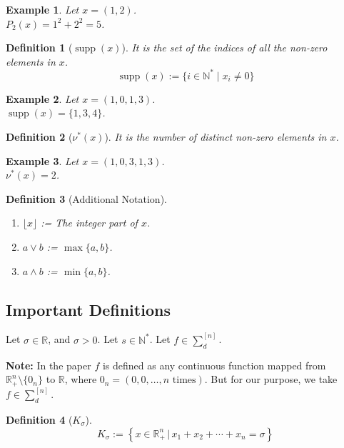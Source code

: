 \documentclass[12pt]{article}
\newtheorem{definition}{Definition}
\newtheorem{example}{Example}
\theoremstyle{definition}
\DeclareMathOperator{\supp}{supp}
\begin{document}
\begin{example}
Let $x = (1, 2)$.\\
$P_2(x) = 1^2 + 2^2 = 5$.
\end{example}

\begin{definition}[$\supp(x)$]\label{def:supp}
It is the set of the indices of all the non-zero elements in $x$.
\[
\supp(x) := \{i \in \mathbb{N}^* \mid x_i \neq 0\}
\]
\end{definition}

\begin{example}
Let $x = (1, 0, 1, 3)$.\\
$\supp(x) = \{1, 3, 4\}$.
\end{example}

\begin{definition}[$\nu^*(x)$]\label{def:nustar}
It is the number of distinct non-zero elements in $x$.
\end{definition}

\begin{example}
Let $x = (1, 0, 3, 1, 3)$.\\
$\nu^*(x) = 2$.
\end{example}

\begin{definition}[Additional Notation]\label{def:additional}
\begin{enumerate}
\item[$\alpha$)] $\lfloor x \rfloor$ := The integer part of $x$.
\item[$\beta$)] $a \vee b$ := $\max\{a, b\}$.
\item[$\gamma$)] $a \wedge b$ := $\min\{a, b\}$.
\end{enumerate}
\end{definition}

\subsection{Important Definitions}

Let $\sigma \in \mathbb{R}$, and $\sigma > 0$. Let $s \in \mathbb{N}^*$. Let $f \in \sum_d^{[n]}$.

\textbf{Note:} In the paper $f$ is defined as any continuous function mapped from $\mathbb{R}^n_+ \setminus \{0_n\}$ to $\mathbb{R}$, where $0_n = (0, 0, \ldots, n \text{ times})$. But for our purpose, we take $f \in \sum_d^{[n]}$.

\begin{definition}[$K_{\sigma}$]\label{def:Ksigma}
\[
K_{\sigma} := \left\{x \in \mathbb{R}^n_+ \,\Big|\, x_1 + x_2 + \cdots + x_n = \sigma\right\}
\]
\end{definition}
\end{document}
